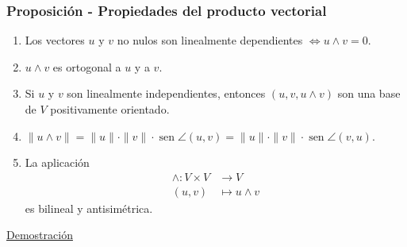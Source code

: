 \documentclass[12pt, a4paper, ones, notitlepage, openany,titlepage]{article}
\newcommand{\demostracion}{\noindent\underline{Demostración}}
\begin{document}
\subsubsection{Proposición - Propiedades del producto vectorial}
\begin{enumerate}
	\item Los vectores $u$ y $v$ no nulos son linealmente dependientes $\Longleftrightarrow u \wedge v = 0$.
	\item $u \wedge v$ es ortogonal a $u$ y a $v$.
	\item Si $u$ y $v$ son linealmente independientes, entonces $(u,v,u \wedge v)$ son una base de $V$ positivamente orientado.
	\item $\|u \wedge v \| = \|u\| \cdot \|v\| \cdot \operatorname{sen} \angle (u,v) = \|u\| \cdot \|v\| \cdot \operatorname{sen} \angle (v,u)$.
	\item La aplicación
	\begin{align*}
		\wedge : V \times V & \longrightarrow V \\
		(u,v) & \longmapsto u \wedge v
	\end{align*}
	es bilineal y antisimétrica.
\end{enumerate}
\demostracion\\
\end{document}
